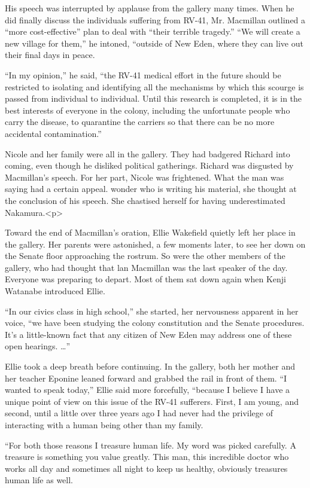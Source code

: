 \documentclass[]{article}
\begin{document}
{His speech was interrupted by applause from the gallery many times. When he did finally discuss the individuals suffering from RV-41, Mr. Macmillan outlined a “more cost-effective” plan to deal with “their terrible tragedy.” “We will create a new village for them,” he intoned, “outside of New Eden, where they can live out their final days in peace.

“In my opinion,” he said, “the RV-41 medical effort in the future should be restricted to isolating and identifying all the mechanisms by which this scourge is passed from individual to individual. Until this research is completed, it is in the best interests of everyone in the colony, including the unfortunate people who carry the disease, to quarantine the carriers so that there can be no more accidental contamination.”

Nicole and her family were all in the gallery. They had badgered Richard into coming, even though he disliked political gatherings. Richard was disgusted by Macmillan’s speech. For her part, Nicole was frightened. What the man was saying had a certain appeal. wonder who is writing his material, she thought at the conclusion of his speech. She chastised herself for having underestimated Nakamura.<p>

Toward the end of Macmillan’s oration, Ellie Wakefield quietly left her place in the gallery. Her parents were astonished, a few moments later, to see her down on the Senate floor approaching the rostrum. So were the other members of the gallery, who had thought that lan Macmillan was the last speaker of the day. Everyone was preparing to depart. Most of them sat down again when Kenji Watanabe introduced Ellie.

“In our civics class in high school,” she started, her nervousness apparent in her voice, “we have been studying the colony constitution and the Senate procedures. It’s a little-known fact that any citizen of New Eden may address one of these open hearings. …”

Ellie took a deep breath before continuing. In the gallery, both her mother and her teacher Eponine leaned forward and grabbed the rail in front of them. “I wanted to speak today,” Ellie said more forcefully, “because I believe I have a unique point of view on this issue of the RV-41 sufferers. First, I am young, and second, until a little over three years ago I had never had the privilege of interacting with a human being other than my family.

“For both those reasons I treasure human life. My word was picked carefully. A treasure is something you value greatly. This man, this incredible doctor who works all day and sometimes all night to keep us healthy, obviously treasures human life as well.

}
\end{document}
